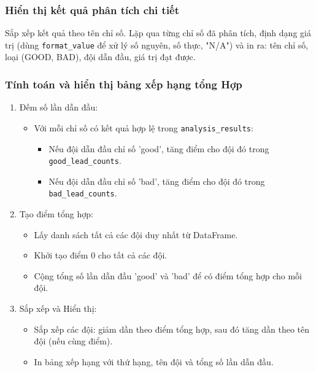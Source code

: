 \documentclass[12pt, a4paper]{report}
\begin{document}
\subsubsection*{Hiển thị kết quả phân tích chi tiết}
Sắp xếp kết quả theo tên chỉ số.
Lặp qua từng chỉ số đã phân tích, định dạng giá trị (dùng \texttt{format\_value} để xử lý số nguyên, số thực, "N/A") và in ra: tên chỉ số, loại (GOOD, BAD), đội dẫn đầu, giá trị đạt được.

\subsubsection*{Tính toán và hiển thị bảng xếp hạng tổng Hợp}
\begin{enumerate}[label*=\textbf{Bước \arabic*:}, leftmargin=*]
    \item Đếm số lần dẫn đầu:
    \begin{itemize}[leftmargin=0em]
        \item Với mỗi chỉ số có kết quả hợp lệ trong \texttt{analysis\_results}:
        \begin{itemize}
            \item Nếu đội dẫn đầu chỉ số 'good', tăng điểm cho đội đó trong \texttt{good\_lead\_counts}.
            \item Nếu đội dẫn đầu chỉ số 'bad', tăng điểm cho đội đó trong \texttt{bad\_lead\_counts}.
        \end{itemize}
    \end{itemize}
    \item Tạo điểm tổng hợp:
    \begin{itemize}[leftmargin=0em]
        \item Lấy danh sách tất cả các đội duy nhất từ DataFrame.
        \item Khởi tạo điểm 0 cho tất cả các đội.
        \item Cộng tổng số lần dẫn đầu 'good' và 'bad' để có điểm tổng hợp cho mỗi đội.
    \end{itemize}
    \item Sắp xếp và Hiển thị:
    \begin{itemize}[leftmargin=0em]
        \item Sắp xếp các đội: giảm dần theo điểm tổng hợp, sau đó tăng dần theo tên đội (nếu cùng điểm).
        \item In bảng xếp hạng với thứ hạng, tên đội và tổng số lần dẫn đầu.
    \end{itemize}
\end{enumerate}
\end{document}
